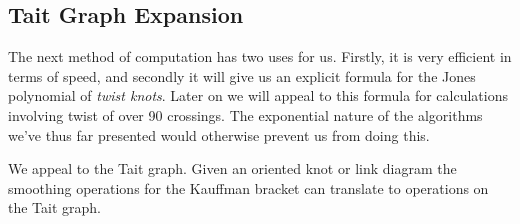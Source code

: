         \subsection{Tait Graph Expansion}
            The next method of computation has two uses for us. Firstly, it is
            very efficient in terms of speed, and secondly it will give us an
            explicit formula for the Jones polynomial of \textit{twist knots}.
            Later on we will appeal to this formula for calculations
            involving twist of over 90 crossings. The exponential nature of
            the algorithms we've thus far presented would otherwise prevent us
            from doing this.
            \par\hfill\par
            We appeal to the Tait graph. Given an oriented knot or link diagram
            the smoothing operations for the Kauffman bracket can translate to
            operations on the Tait graph.
